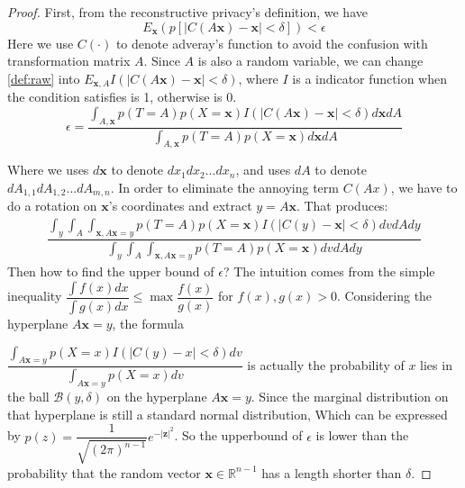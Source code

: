 \begin{proof}
    First, from the reconstructive privacy's definition, we have 
    \begin{equation}
        \label{def:raw}
        E_\mathbf x(p[|C(A\mathbf x) - \mathbf x| < \delta]) < \epsilon
    \end{equation}
     Here we use $C(·)$ to denote adveray's function to avoid the confusion with transformation matrix $A$. Since $A$ is also a random variable, we can change \eqref{def:raw} into $E_{\mathbf x, A}I(|C(A\mathbf x) - \mathbf x| <\delta)$, where $I$ is a indicator function when the condition satisfies is 1, otherwise is 0. 
    \begin{equation}
        \epsilon =\dfrac{ \int_{A, \mathbf x}p(T=A)p(X=\mathbf x)I(|C(A\mathbf x)-\mathbf x|<\delta)d\mathbf xdA}{ \int_{A,\mathbf x}p(T=A)p(X=\mathbf x)d\mathbf xdA}
    \end{equation}
    
    Where we uses $d\mathbf x$ to denote $dx_1dx_2...dx_n$, and uses $dA$ to denote $dA_{1,1}dA_{1,2}...dA_{m, n}$. In order to eliminate the annoying term $C(Ax)$, we have to do a rotation on $\mathbf x$'s coordinates and extract $y = A\mathbf x$. That produces:
    \begin{equation}
    \begin{split}
        \dfrac{ \int_y \int_{A} \int_{\mathbf x, A\mathbf x=y}p(T=A)p(X=\mathbf x)I(|C(y)-\mathbf x|<\delta)dvdAdy}{ \int_y \int_{A} \int_{\mathbf x, A\mathbf x= y}p(T=A)p(X=\mathbf x)dvdAdy}
    \end{split}
    \end{equation}
    Then how to find the upper bound of $\epsilon$? The intuition comes from the simple inequality $\dfrac {\int f(x) dx}{\int g(x) dx} \le \max \dfrac{f(x)}{g(x)}$ for $f(x), g(x) > 0$. Considering the hyperplane $A\mathbf x = y$, the formula 
    
    $\dfrac {\int_{A\mathbf x = y}p(X=x)I(|C(y) - x| < \delta)dv}{\int_{A\mathbf x = y}p(X=x)dv}$ is actually the probability of $x$ lies in the ball $\mathcal B(y, \delta)$ on the hyperplane $A\mathbf x = y$. Since the marginal distribution on that hyperplane is still a standard normal distribution, Which can be expressed by $p(z) = \dfrac{1}{\sqrt{(2\pi)^{n-1}}}e^{-|\mathbf z|^2}$. So the upperbound of $\epsilon$ is lower than the probability that the random vector $\mathbf x \in \mathbb R^{n-1}$ has a length shorter than $\delta$.
\end{proof}

